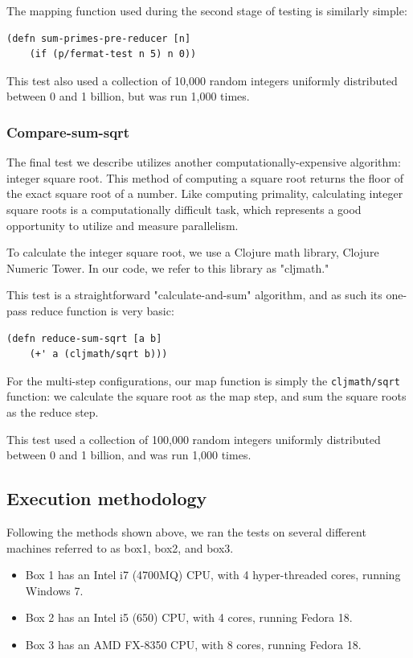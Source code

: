 \documentclass[12pt]{article}
\begin{document}
The mapping function used during the second stage of testing is similarly simple:

\begin{verbatim}
(defn sum-primes-pre-reducer [n] 
    (if (p/fermat-test n 5) n 0))
\end{verbatim}

This test also used a collection of 10,000 random integers uniformly distributed between 0 and 1 billion, but was run 1,000 times.
 
\subsubsection{Compare-sum-sqrt}\label{sec:sum-sqrt}
 
The final test we describe utilizes another computationally-expensive algorithm: integer square root. This method of computing a square root returns the floor of the exact square root of a number. Like computing primality, calculating integer square roots is a computationally difficult task, which represents a good opportunity to utilize and measure parallelism. 

To calculate the integer square root, we use a Clojure math library, Clojure Numeric Tower. In our code, we refer to this library as "cljmath."

This test is a straightforward "calculate-and-sum" algorithm, and as such its one-pass reduce function is very basic:

\begin{verbatim}
(defn reduce-sum-sqrt [a b] 
    (+' a (cljmath/sqrt b)))
\end{verbatim}

For the multi-step configurations, our map function is simply the \texttt{cljmath/sqrt} function: we calculate the square root as the map step, and sum the square roots as the reduce step.
 
This test used a collection of 100,000 random integers uniformly distributed between 0 and 1 billion, and was run 1,000 times.
 
 \subsection{Execution methodology}\label{sec:eMethods}
 Following the methods shown above, we ran the tests on several different machines referred to as box1, box2, and box3.
 
\begin{itemize}
 \item 
 Box 1 has an Intel i7 (4700MQ) CPU, with 4 hyper-threaded cores, running Windows 7.
 \item
 Box 2 has an Intel i5 (650) CPU, with 4 cores, running Fedora 18.
 \item
 Box 3 has an AMD FX-8350 CPU, with 8 cores, running Fedora 18. 
 \end{itemize}
  
\end{document}
